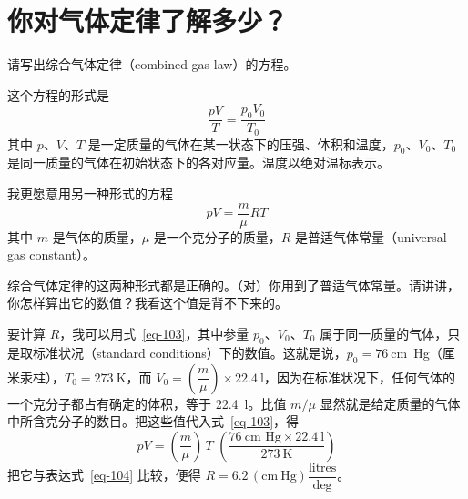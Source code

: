 
\chapter[你对气体定律了解多少？]{你对气体定律了解多少？\label{ch-20}}

\begin{dialogue}

\tchr 请写出综合气体定律（combined gas law）的方程。

\stda 这个方程的形式是
\begin{equation}%
\frac{pV}{T} = \frac{p_{0}V_{0}}{T_{0}}
\label{eq-103}
\end{equation}
其中 $p$、$V$、$T$ 是一定质量的气体在某一状态下的压强、体积和温度，$p_{0}$、$V_{0}$、$T_{0}$ 是同一质量的气体在初始状态下的各对应量。温度以绝对温标表示。

\stdb 我更愿意用另一种形式的方程
\begin{equation}%
pV = \frac{m}{\mu} RT
\label{eq-104}
\end{equation}
其中 $m$ 是气体的质量，$\mu$ 是一个克分子的质量，$R$ 是普适气体常量（universal gas constant）。

\tchr 综合气体定律的这两种形式都是正确的。（对）你用到了普适气体常量。请讲讲，你怎样算出它的数值？我看这个值是背不下来的。

\stdb 要计算 $R$，我可以用式~\eqref{eq-103}，其中参量 $p_{0}$、$V_{0}$、$T_{0}$ 属于同一质量的气体，只是取标准状况（standard conditions）下的数值。这就是说，$p_{0}= \SI{76}{\centi\meter}$~Hg（厘米汞柱），$T_{0}=\SI{273}{\kelvin}$，而 $V_{0} =\left( \dfrac{m}{\mu} \right) \times \SI{22.4}{\litre}$，因为在标准状况下，任何气体的一个克分子都占有确定的体积，等于 \SI{22.4}{\litre}。比值 $m/\mu$ 显然就是给定质量的气体中所含克分子的数目。把这些值代入式~\eqref{eq-103}，得
\begin{equation*}%
pV = \left( \frac{m}{\mu}\right) \, T \,\, \left( \frac{\SI{76}{\centi\meter} \,\,\text{Hg} \times \SI{22.4}{\litre}}{\SI{273}{\kelvin}} \right)
\end{equation*}
把它与表达式~\eqref{eq-104} 比较，便得 $R=6.2 \,(\si{\centi\meter}~\text{Hg}) \dfrac{\text{litres}}{\text{deg}}$。


\end{dialogue}
